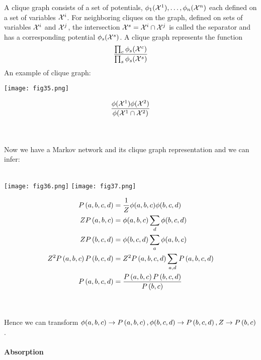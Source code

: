 A clique graph consists of a set of potentials, $\phi_1(\mathcal{X}^1),\dotsc,\phi_n(\mathcal{X}^n)$ each defined on a set of variables $\mathcal{X}^i$. For neighboring cliques on the graph, defined on sets of variables $\mathcal{X}^i$ and $\mathcal{X}^j$, the intersection $\mathcal{X}^s=\mathcal{X}^i\cap\mathcal{X}^j$ is called the separator and has a corresponding potential $\phi_s(\mathcal{X}^s)$. A clique graph represents the function
\begin{align*}
	\frac{\prod_c\phi_s(\mathcal{X}^c)}{\prod_s\phi_s(\mathcal{X}^s)}
\end{align*}
An example of clique graph:

\begin{minipage}{0.4\textwidth}
	\centering
	\texttt{[image: fig35.png]}
\end{minipage}
\begin{minipage}{0.6\textwidth}
	\begin{align*}
	\frac{\phi(\mathcal{X}^1)\phi(\mathcal{X}^2)}{\phi(\mathcal{X}^1\cap\mathcal{X}^2)}
	\end{align*}
\end{minipage}
\\ \\
Now we have a Markov network and its clique graph representation and we can infer:
\\ \\
\begin{minipage}{0.4\textwidth}
	\centering
	\texttt{[image: fig36.png]}
	\newline\newline
	\texttt{[image: fig37.png]}
\end{minipage}
\begin{minipage}{0.6\textwidth}
	\begin{align*}
		P\left(a,b,c,d\right)&=\frac{1}{Z}\phi(a,b,c)\phi(b,c,d) \\
		ZP\left(a,b,c\right)&=\phi(a,b,c)\sum_d\phi(b,c,d) \\
		ZP\left(b,c,d\right)&=\phi(b,c,d)\sum_a\phi(a,b,c) \\
		Z^2P\left(a,b,c\right)P\left(b,c,d\right)&=Z^2P\left(a,b,c,d\right)\sum_{a,d}P\left(a,b,c,d\right) \\
		P\left(a,b,c,d\right)&=\frac{P\left(a,b,c\right)P\left(b,c,d\right)}{P\left(b,c\right)}
	\end{align*}
\end{minipage}
\\ \\
Hence we can transform $\phi(a,b,c)\to P\left(a,b,c\right),\phi(b,c,d)\to P\left(b,c,d\right),Z\to P\left(b,c\right)$.

\paragraph{Absorption}

